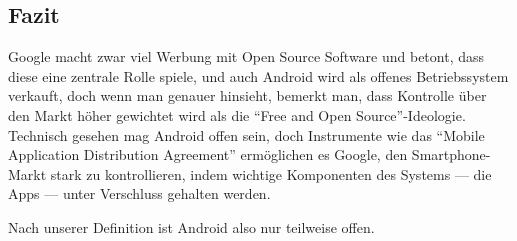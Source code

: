 \subsection{Fazit}
Google macht zwar viel Werbung mit Open Source Software und betont, dass diese eine zentrale Rolle spiele\thinspace\cite{online:google-open-source}, und auch Android wird als offenes Betriebssystem verkauft\thinspace\cite{online:android-open-source}, doch wenn man genauer hinsieht, bemerkt man, dass Kontrolle über den Markt höher gewichtet wird als die ``Free and Open Source''-Ideologie. Technisch gesehen mag Android offen sein, doch Instrumente wie das ``Mobile Application Distribution Agreement'' ermöglichen es Google, den \mbox{Smartphone-Markt} stark zu kontrollieren, indem wichtige Komponenten des Systems --- die Apps --- unter Verschluss gehalten werden. 

Nach unserer Definition ist Android also nur teilweise offen.